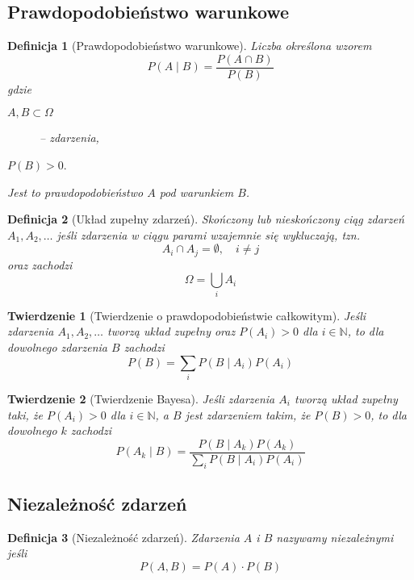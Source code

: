 \documentclass[11pt, leqno]{scrartcl}
\theoremstyle{mydefinition}
\newtheorem{definition}{Definicja}[subsection]
\theoremstyle{mytheorem}
\newtheorem{theorem}{Twierdzenie}[subsection]
\begin{document}
    \subsection{Prawdopodobieństwo warunkowe}
    \begin{definition}[Prawdopodobieństwo warunkowe]
        Liczba określona wzorem
        \[
            P(A \mid B)=\frac{P(A \cap B)}{P(B)}
        \]
        gdzie
        \begin{description}
            \item[$A,B \subset \Omega$] -- zdarzenia,
            \item[$P(B)>0$.]
        \end{description}
        Jest to prawdopodobieństwo $A$ pod warunkiem $B$.
    \end{definition}
    \begin{definition}[Układ zupełny zdarzeń]
        Skończony lub nieskończony ciąg zdarzeń $A_1,A_2,\dots$ jeśli
        zdarzenia w ciągu parami wzajemnie się wykluczają, tzn.
        \[
            A_i \cap A_j =\emptyset, \quad i \neq j
        \]
        oraz zachodzi
        \[
            \Omega=\bigcup_{i}A_i
        \]
    \end{definition}
    \begin{theorem}[Twierdzenie o prawdopodobieństwie całkowitym]
        Jeśli zdarzenia $A_1,A_2,\dots$ tworzą układ zupełny oraz
        $P(A_i)>0$ dla $i \in \mathbb{N}$, to dla dowolnego
        zdarzenia $B$ zachodzi
        \[
            P(B)=\sum_{i}P(B \mid A_i)P(A_i)
        \]
    \end{theorem}
    \begin{theorem}[Twierdzenie Bayesa]
        Jeśli zdarzenia $A_i$ tworzą układ zupełny taki, że
        $P(A_i)>0$ dla $i \in \mathbb{N}$, a $B$ jest zdarzeniem
        takim, że $P(B)>0$, to dla dowolnego $k$ zachodzi
        \[
            P(A_k \mid B)=\frac{P(B \mid A_k)P(A_k)}
            {\sum_{i}P(B \mid A_i)P(A_i)}
        \]
    \end{theorem}
    
    \subsection{Niezależność zdarzeń}
    \begin{definition}[Niezależność zdarzeń]
        Zdarzenia $A$ i $B$ nazywamy niezależnymi jeśli
        \[
            P(A,B)=P(A) \cdot P(B)
        \]
    \end{definition}
\end{document}
